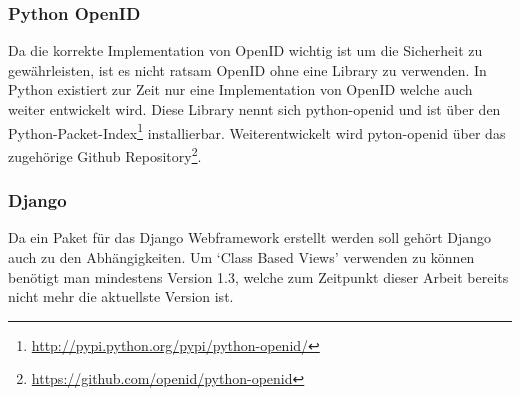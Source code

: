 \subsubsection{Python OpenID}
\label{ssub:Python OpenID}
Da die korrekte Implementation von OpenID wichtig ist um die Sicherheit zu gewährleisten, ist es nicht ratsam OpenID ohne eine Library zu verwenden. In Python existiert zur Zeit nur eine Implementation von OpenID welche auch weiter entwickelt wird. Diese Library nennt sich python-openid und ist über den Python-Packet-Index\footnote{\url{http://pypi.python.org/pypi/python-openid/}} installierbar. Weiterentwickelt wird pyton-openid über das zugehörige Github Repository\footnote{\url{https://github.com/openid/python-openid}}.

\subsubsection{Django}
\label{ssub:Django}
Da ein Paket für das Django Webframework erstellt werden soll gehört Django auch zu den Abhängigkeiten. Um `Class Based Views' verwenden zu können benötigt man mindestens Version 1.3, welche zum Zeitpunkt dieser Arbeit bereits nicht mehr die aktuellste Version ist.
